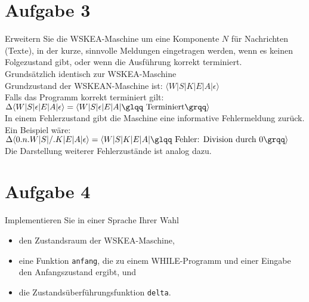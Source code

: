 \documentclass[ngerman,a4paper]{report}
\begin{document}
\section*{Aufgabe 3}
Erweitern Sie die WSKEA-Maschine um eine Komponente $N$ für Nachrichten (Texte), in der kurze, sinnvolle Meldungen eingetragen werden, wenn es keinen Folgezustand gibt, oder wenn die Ausführung korrekt terminiert.\\

Grundsätzlich identisch zur WSKEA-Maschine\\

Grundzustand der WSKEAN-Maschine ist: $\langle W|S|K|E|A|\epsilon\rangle$\\

Falls das Programm korrekt terminiert gilt: $\Delta\langle W|S|\epsilon|E|A|\epsilon\rangle = \langle W|S|\epsilon|E|A|\text{\glqq Terminiert\grqq} \rangle$\\

In einem Fehlerzustand gibt die Maschine eine informative Fehlermeldung zurück. Ein Beispiel wäre:\\

$\Delta\langle 0.n.W|S|/.K|E|A|\epsilon\rangle = \langle W|S|K|E|A|\text{\glqq Fehler: Division durch 0\grqq}\rangle$\\

Die Darstellung weiterer Fehlerzustände ist analog dazu.

\section*{Aufgabe 4 }
Implementieren Sie in einer Sprache Ihrer Wahl
\begin{itemize}
	\item den Zustandsraum der WSKEA-Maschine,
	\item eine Funktion \texttt{anfang}, die zu einem WHILE-Programm und einer Eingabe den Anfangszustand ergibt, und
	\item die Zustandsüberführungsfunktion \texttt{delta}.
\end{itemize}
\end{document}
